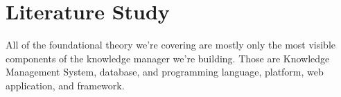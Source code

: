 \chapter{Literature Study}
\label{chap:literature-study}

All of the foundational theory we're covering are mostly only the most visible components of the knowledge manager we're building. Those are Knowledge Management System, database, and programming language, platform, web application, and framework.
